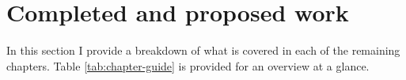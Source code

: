 \section{Completed and proposed work}

In this section I provide a breakdown of what is covered in each of the remaining chapters.
Table \ref{tab:chapter-guide} is provided for an overview at a glance.




